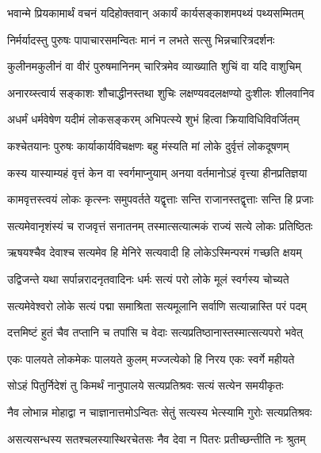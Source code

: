 \twolineshloka
{भवान्मे प्रियकामार्थं वचनं यदिहोक्तवान्}
{अकार्यं कार्यसङ्काशमपथ्यं पथ्यसम्मितम्} %

\twolineshloka
{निर्मर्यादस्तु पुरुषः पापाचारसमन्वितः}
{मानं न लभते सत्सु भिन्नचारित्रदर्शनः} %

\twolineshloka
{कुलीनमकुलीनं वा वीरं पुरुषमानिनम्}
{चारित्रमेव व्याख्याति शुचिं वा यदि वाशुचिम्} %

\twolineshloka
{अनारय्स्त्वार्य सङ्काशः शौचाद्धीनस्तथा शुचिः}
{लक्षण्यवदलक्षण्यो दुःशीलः शीलवानिव} %

\twolineshloka
{अधर्मं धर्मवेषेण यदीमं लोकसङ्करम्}
{अभिपत्स्ये शुभं हित्वा क्रियाविधिविवर्जितम्} %

\twolineshloka
{कश्चेतयानः पुरुषः कार्याकार्यविचक्षणः}
{बहु मंस्यति मां लोके दुर्वृत्तं लोकदूषणम्} %

\twolineshloka
{कस्य यास्याम्यहं वृत्तं केन वा स्वर्गमाप्नुयाम्}
{अनया वर्तमानोऽहं वृत्त्या हीनप्रतिज्ञया} %

\twolineshloka
{कामवृत्तस्त्वयं लोकः कृत्स्नः समुपवर्तते}
{यद्वृत्ताः सन्ति राजानस्तद्वृत्ताः सन्ति हि प्रजाः} %

\twolineshloka
{सत्यमेवानृशंस्यं च राजवृत्तं सनातनम्}
{तस्मात्सत्यात्मकं राज्यं सत्ये लोकः प्रतिष्ठितः} %

\twolineshloka
{ऋषयश्चैव देवाश्च सत्यमेव हि मेनिरे}
{सत्यवादी हि लोकेऽस्मिन्परमं गच्छति क्षयम्} %

\twolineshloka
{उद्विजन्ते यथा सर्पान्नरादनृतवादिनः}
{धर्मः सत्यं परो लोके मूलं स्वर्गस्य चोच्यते} %

\twolineshloka
{सत्यमेवेश्वरो लोके सत्यं पद्मा समाश्रिता}
{सत्यमूलानि सर्वाणि सत्यान्नास्ति परं पदम्} %

\twolineshloka
{दत्तमिष्टं हुतं चैव तप्तानि च तपांसि च}
{वेदाः सत्यप्रतिष्ठानास्तस्मात्सत्यपरो भवेत्} %

\twolineshloka
{एकः पालयते लोकमेकः पालयते कुलम्}
{मज्जत्येको हि निरय एकः स्वर्गे महीयते} %

\twolineshloka
{सोऽहं पितुर्निदेशं तु किमर्थं नानुपालये}
{सत्यप्रतिश्रवः सत्यं सत्येन समयीकृतः} %

\twolineshloka
{नैव लोभान्न मोहाद्वा न चाज्ञानात्तमोऽन्वितः}
{सेतुं सत्यस्य भेत्स्यामि गुरोः सत्यप्रतिश्रवः} %

\twolineshloka
{असत्यसन्धस्य सतश्चलस्यास्थिरचेतसः}
{नैव देवा न पितरः प्रतीच्छन्तीति नः श्रुतम्} %

